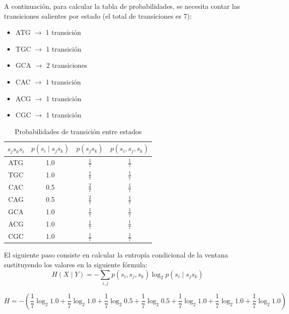 \documentclass[11pt,spanish,listoffigures,listoftables]{tfgetsinf}
\begin{document}
A continuación, para calcular la tabla de probabilidades, se necesita contar las transiciones salientes por estado (el total de transiciones es 7):

\begin{itemize}
   \item ATG \(\rightarrow\) 1 transición
   \item TGC \(\rightarrow\) 1 transición
   \item GCA \(\rightarrow\) 2 transiciones
   \item CAC \(\rightarrow\) 1 transición
   \item ACG \(\rightarrow\) 1 transición
   \item CGC \(\rightarrow\) 1 transición
\end{itemize}



\begin{table}[H]
\centering
\renewcommand{\arraystretch}{1.5} %
\setlength{\tabcolsep}{12pt}      %
\large                             %
\caption{Probabilidades de transición entre estados}
\label{tabla:transiciones}
\begin{tabular}{|c|c|c|c|}
\hline
\textbf{\( s_j s_k s_i \)} & \textbf{\( p(s_i \mid s_j s_k) \)} & \textbf{\( p(s_j s_k) \)} & \textbf{\( p(s_i, s_j, s_k) \)} \\
\hline
ATG & 1.0 & \( \frac{1}{7} \) & \( \frac{1}{7} \) \\
TGC & 1.0 & \( \frac{1}{7} \) & \( \frac{1}{7} \) \\
CAC & 0.5 & \( \frac{2}{7} \) & \( \frac{1}{7} \) \\
CAG & 0.5 & \( \frac{2}{7} \) & \( \frac{1}{7} \) \\
GCA & 1.0 & \( \frac{1}{7} \) & \( \frac{1}{7} \) \\
ACG & 1.0 & \( \frac{1}{7} \) & \( \frac{1}{7} \) \\
CGC & 1.0 & \( \frac{1}{7} \) & \( \frac{1}{7} \) \\
\hline
\end{tabular}
\end{table}


El siguiente paso consiste en calcular la entropía condicional de la ventana sustituyendo los valores en la siguiente fórmula:
\[
H(X \mid Y) = - \sum_{i,j} p(s_i, s_j, s_k) \log_2 p(s_i \mid s_j s_k)
\]

\[
H = - \left(
\frac{1}{7} \log_2 1.0 +
\frac{1}{7} \log_2 1.0 +
\frac{1}{7} \log_2 0.5 +
\frac{1}{7} \log_2 0.5 +
\frac{1}{7} \log_2 1.0 +
\frac{1}{7} \log_2 1.0 +
\frac{1}{7} \log_2 1.0
\right)
\]
\end{document}
